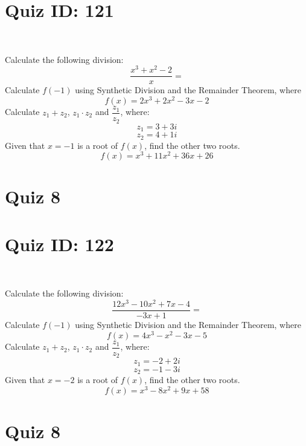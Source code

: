 \documentclass{exam}
\begin{document}
\section*{Quiz ID: 121}
\vspace{0.5cm}\
\vspace{1cm}\
\begin{questions}
\question Calculate the following division:\[\dfrac{
x^3 + x^2 - 2}{
x}=\] \makeemptybox{\stretch{2}}
\question Calculate $f(-1)$ using Synthetic Division and the Remainder Theorem, where\[f(x) = 
2x^3 + 2x^2 - 3x - 2\]
\newpage\question Calculate $z_1+z_2$, $z_1\cdot z_2$ and $\dfrac{z_1}{z_2}$, where:\[z_1=3+3\mathit{i}\]\[z_2=4+1\mathit{i}\]
\question Given that $x=-1$ is a root of $f(x)$, find the other two roots.\[f(x)=
x^3 + 11x^2 + 36x + 26\]\makeemptybox{\stretch{1}}
\end{questions}\newpage
\newpage
\section*{Quiz 8}
\section*{Quiz ID: 122}
\vspace{0.5cm}\
\vspace{1cm}\
\begin{questions}
\question Calculate the following division:\[\dfrac{
12x^3 - 10x^2 + 7x - 4}{
-3x + 1}=\] 
\question Calculate $f(-1)$ using Synthetic Division and the Remainder Theorem, where\[f(x) = 
4x^3 - x^2 - 3x - 5\]
\newpage\question Calculate $z_1+z_2$, $z_1\cdot z_2$ and $\dfrac{z_1}{z_2}$, where:\[z_1=-2+2\mathit{i}\]\[z_2=-1-3\mathit{i}\]\makeemptybox{\stretch{1}}
\question Given that $x=-2$ is a root of $f(x)$, find the other two roots.\[f(x)=
x^3 - 8x^2 + 9x + 58\]\makeemptybox{\stretch{1}}
\end{questions}\newpage
\newpage
\section*{Quiz 8}
\end{document}
